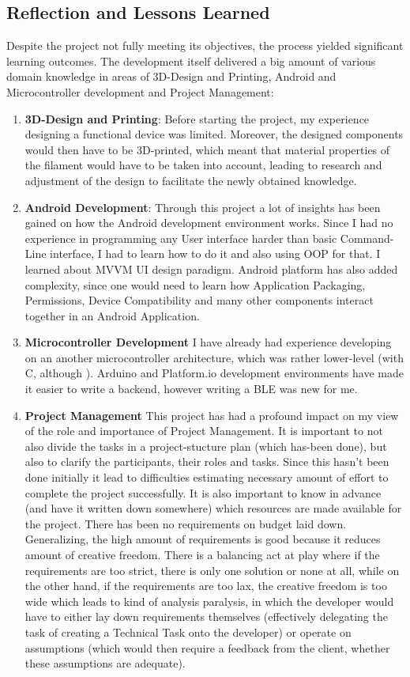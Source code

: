 \subsection{Reflection and Lessons Learned} 
Despite the project not fully meeting its objectives, the process yielded significant learning outcomes. The development itself delivered a big amount of various domain knowledge in areas of 3D-Design and Printing, Android and Microcontroller development and Project Management:
\begin{enumerate}
	\item \textbf{3D-Design and Printing}: Before starting the project, my experience designing a functional device was limited. Moreover, the designed components would then have to be 3D-printed, which meant that material properties of the filament would have to be taken into account, leading to research and adjustment of the design to facilitate the newly obtained knowledge.
	\item \textbf{Android Development}: Through this project a lot of insights has been gained on how the Android development environment works. Since I had no experience in programming any User interface harder than basic Command-Line interface, I had to learn how to do it and also using \ac{OOP} for that. I learned about \ac{MVVM} \ac{UI} design paradigm. Android platform has also added complexity, since one would need to learn how Application Packaging, Permissions, Device Compatibility and many other components interact together in an Android Application.
	\item \textbf{Microcontroller Development} I have already had experience developing on an another microcontroller architecture, which was rather lower-level (with C, although ). Arduino and Platform.io development environments have made it easier to write a backend, however writing a \ac{BLE} was new for me. 
	\item \textbf{Project Management} This project has had a profound impact on my view of the role and importance of Project Management. It is important to not also divide the tasks in a project-stucture plan (which has-been done), but also to clarify the participants, their roles and tasks. Since this hasn't been done initially it lead to difficulties estimating necessary amount of effort to complete the project successfully. It is also important to know in advance (and have it written down somewhere) which resources are made available for the project. There has been no requirements on budget laid down. Generalizing, the high amount of requirements is good because it reduces amount of creative freedom. There is a balancing act at play where if the requirements are too strict, there is only one solution or none at all, while on the other hand, if the requirements are too lax, the creative freedom is too wide which leads to kind of analysis paralysis, in which the developer would have to either lay down requirements themselves (effectively delegating the task of creating a Technical Task onto the developer) or operate on assumptions (which would then require a feedback from the client, whether these assumptions are adequate).
\end{enumerate}


